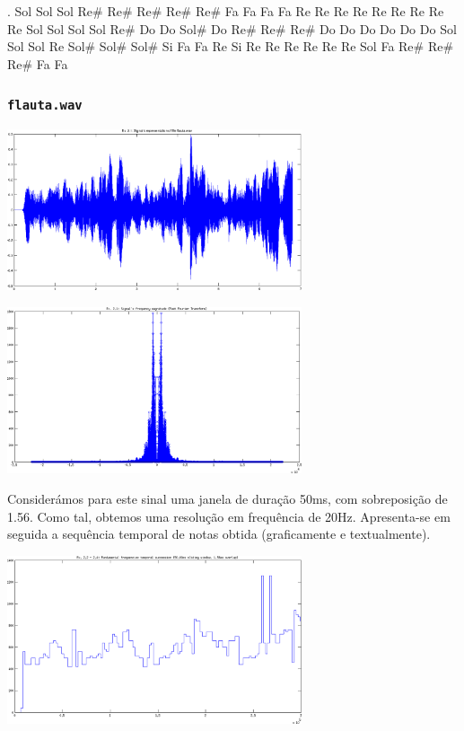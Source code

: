 \documentclass[a4paper]{article}
\begin{document}
. Sol Sol Sol Re\# Re\# Re\# Re\# Re\# Fa Fa Fa Fa Re Re Re Re Re Re Re Re Re Sol Sol Sol Sol Re\# Do Do Sol\# Do Re\# Re\# Re\# Do Do Do Do Do Do Sol Sol Sol Re Sol\# Sol\# Sol\# Si Fa Fa Re Si Re Re Re Re Re Re Sol Fa Re\# Re\# Re\# Fa Fa

\subsubsection{\texttt{flauta.wav}}
\begin{center}
	\includegraphics[width=0.65\textwidth]{images/ex_2_1_flauta_sign.png}
\end{center}
\begin{center}
	\includegraphics[width=0.65\textwidth]{images/ex_2_1_flauta_mag.png}
\end{center}

\indent \indent Considerámos para este sinal uma janela de duração 50ms, com sobreposição de 1.56. Como tal, obtemos uma resolução em frequência de 20Hz. Apresenta-se em seguida a sequência temporal de notas obtida (graficamente e textualmente).
\begin{center}
	\includegraphics[width=0.65\textwidth]{images/ex_2_2_flauta.png}
\end{center}
\end{document}
